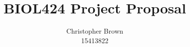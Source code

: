 \documentclass[a4paper,11pt]{article}
\title{BIOL424 Project Proposal}
\author{
	Christopher Brown\\15413822
}
\date{}
\begin{document}
\maketitle

\FloatBarrier
\printbibliography
\end{document}
